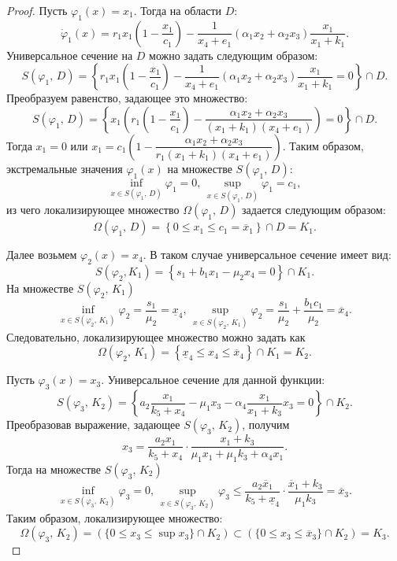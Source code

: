 \documentclass[14pt,a4paper]{extarticle}
\begin{document}
	\begin{proof} 
		Пусть $\varphi_1(x)=x_1$. Тогда на области $D$:
		\[\dot{\varphi}_1(x)=r_1x_1\left(1-\dfrac{x_1}{c_1}\right)-\dfrac{1}{x_4+e_1}(\alpha_1x_2+\alpha_2x_3)\dfrac{x_1}{x_1+k_1}.\]
		Универсальное сечение на $D$ можно задать следующим образом:
		\[S(\varphi_1,\, D)=\left\{r_1x_1\left(1-\dfrac{x_1}{c_1}\right)-\dfrac{1}{x_4+e_1}(\alpha_1x_2+\alpha_2x_3)\dfrac{x_1}{x_1+k_1}=0\right\}\cap D.\]
		Преобразуем равенство, задающее это множество:
		\[S(\varphi_1,\, D)=\left\{x_1\left(r_1\left(1-\dfrac{x_1}{c_1}\right)-\dfrac{\alpha_1x_2+\alpha_2x_3}{(x_1+k_1)(x_4+e_1)}\right)=0\right\}\cap D.\]
		Тогда $x_1=0$ или $x_1=c_1\left(1-\dfrac{\alpha_1x_2+\alpha_2x_3}{r_1(x_1+k_1)(x_4+e_1)}\right) $. Таким образом, экстремальные значения $\varphi_1(x)$ на множестве $S(\varphi_1,\, D)$:
		\[\inf\limits_{x\in S(\varphi_1,\, D)} \varphi_1=0,\, \sup\limits_{x\in S(\varphi_1,\, D)} \varphi_1=c_1,\]
		из чего локализирующее множество $\Omega(\varphi_1,\, D)$ задается следующим образом:
		\[\Omega(\varphi_1,\, D)=\left\{0\leqslant x_1\leqslant c_1 = \overline{x}_1\right\}\cap D=K_1.\]
		
		Далее возьмем $\varphi_2(x)=x_4$. В таком случае универсальное сечение имеет вид:
		\[S(\varphi_2, K_1)=\left\{s_1 + b_1x_1-\mu_2x_4=0\right\}\cap K_1.\]
		На множестве $S(\varphi_2,\, K_1)$
		\[\inf\limits_{x\in S(\varphi_2,\, K_1)} \varphi_2=\dfrac{s_1}{\mu_2} = \underline{x}_4,\, \sup\limits_{x\in S(\varphi_2,\, K_1)} \varphi_2=\dfrac{s_1}{\mu_2}+\dfrac{b_1c_1}{\mu_2} = \overline{x}_4.\]
		Следовательно, локализирующее множество можно задать как 
		\[\Omega(\varphi_2,\, K_1)=\left\{\underline{x}_4 \leqslant x_4\leqslant \overline{x}_4\right\}\cap K_1=K_2.\]
		
		Пусть $\varphi_3(x)=x_3$. Универсальное сечение для данной функции:
		\[S(\varphi_3,\, K_2)=\left\{a_2\dfrac{x_1}{k_5+x_4}-\mu_1x_3-\alpha_4\dfrac{x_1}{x_1+k_3}x_3=0\right\}\cap K_2.\]
		Преобразовав выражение, задающее $S(\varphi_3,\, K_2)$, получим
		\[x_3=\dfrac{a_2x_1}{k_5+x_4}\cdot\dfrac{x_1+k_3}{\mu_1x_1+\mu_1k_3+\alpha_4x_1}.\]
		Тогда на множестве $S(\varphi_3,\, K_2)$
		\[\inf\limits_{x\in S(\varphi_3,\, K_2)} \varphi_3=0,\, \sup\limits_{x\in S(\varphi_3,\, K_2)} \varphi_3\leqslant \dfrac{a_2\overline{x}_1}{k_5+\underline{x}_4}\cdot\dfrac{\overline{x}_1+k_3}{\mu_1k_3}=\overline{x}_3.\]
		Таким образом, локализирующее множество:
		\[\Omega(\varphi_3,\, K_2) = (\{0\leqslant x_3 \leqslant \sup{x_3}\}\cap K_2) \subset (\{0 \leqslant x_3\leqslant \overline x_3\} \cap K_2) = K_3.\]
		

\end{proof}
\end{document}
